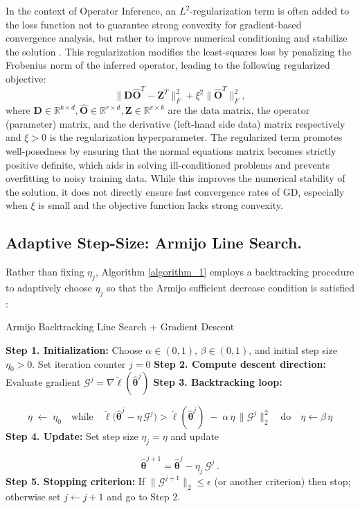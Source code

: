 In the context of Operator Inference, an $L^2$-regularization term is often added to the loss function not to guarantee strong convexity for gradient-based convergence analysis, but rather to improve numerical conditioning and stabilize the solution \cite{opinf2025}. This regularization modifies the least-squares loss by penalizing the Frobenius norm of the inferred operator, leading to the following regularized objective:\\
\begin{equation*}
    \bigl\|\mathbf{D}\widehat{\mathbf{O}}^T - \mathbf{Z}^T\bigr\|_F^2 + \xi^2 \bigl\|\widehat{\mathbf{O}}^T\bigr\|_F^2,
    \label{eq:opinf_regularized_loss}
\end{equation*}
where $\mathbf{D}\in\mathbb{R}^{k\times d},\widehat{\mathbf{O}}\in\mathbb{R}^{r\times d},\mathbf{Z}\in\mathbb{R}^{r\times k}$ are the data matrix, the operator (parameter) matrix, and the derivative (left-hand side data) matrix respectively and $\xi > 0$ is the regularization hyperparameter. The regularized term promotes well-posedness by ensuring that the normal equations matrix becomes strictly positive definite, which aids in solving ill-conditioned problems and prevents overfitting to noisy training data. While this improves the numerical stability of the solution, it does not directly ensure fast convergence rates of GD, especially when $\xi$ is small and the objective function lacks strong convexity.

\subsection*{Adaptive Step-Size: Armijo Line Search.} 
Rather than fixing $\eta_j$, Algorithm \ref{algorithm_1} employs a backtracking procedure to adaptively choose $\eta_j$ so that the Armijo sufficient decrease condition is satisfied \cite{nocedal1999numerical}:

\begin{center}
\begin{minipage}{0.95\textwidth}
\begin{algorithm}[H]
\label{algorithm_1}
\SetAlgoLined
\caption{Armijo Backtracking Line Search + Gradient Descent}
\textbf{Step 1. Initialization:} Choose $\alpha\in(0,1)$, $\beta\in(0,1)$, and initial step size $\eta_{0} > 0$. Set iteration counter $j=0$\;
\textbf{Step 2. Compute descent direction:} Evaluate gradient $\mathscr{G}^j = \nabla \tilde\ell(\hat{\bm\theta}^j)$\;
\textbf{Step 3. Backtracking loop:}

$$\eta \;\leftarrow\;\eta_{0}
    \quad\text{while}\quad
    \tilde\ell\bigl(\hat{\bm\theta}^j - \eta\,\mathscr{G}^j\bigr)
    >
    \tilde\ell(\hat{\bm\theta}^j)
    \;-\;\alpha\,\eta\,\|\mathscr{G}^j\|_2^2
    \quad\text{do}\quad
    \eta \leftarrow \beta\,\eta$$
\textbf{Step 4. Update:} Set step size $\eta_j = \eta$ and update

$$\hat{\bm\theta}^{j+1} = \hat{\bm\theta}^j - \eta_j\,\mathscr{G}^j\,.$$
\textbf{Step 5. Stopping criterion:} If $\|\mathscr{G}^{j+1}\|_2\le\epsilon$ (or another criterion) then stop; otherwise set $j\leftarrow j+1$ and go to Step 2.
\end{algorithm}
\end{minipage}
\end{center}

